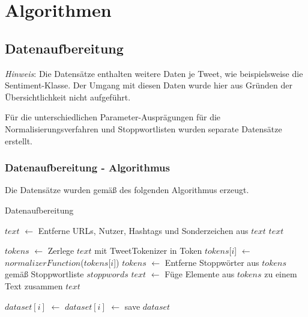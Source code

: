 \section{Algorithmen}

\subsection{Datenaufbereitung}\label{subsec:appendix-data-preparation}

\textit{Hinweis}: Die Datensätze enthalten weitere Daten je Tweet, wie beispielsweise die Sentiment-Klasse.
Der Umgang mit diesen Daten wurde hier aus Gründen der Übersichtlichkeit nicht aufgeführt.

Für die unterschiedlichen Parameter-Ausprägungen für die Normalisierungsverfahren und Stoppwortlisten wurden separate Datensätze erstellt.

\subsubsection{Datenaufbereitung - Algorithmus}
Die Datensätze wurden gemäß des folgenden Algorithmus erzeugt.
\begin{algorithm}
    \caption{Datenaufbereitung}
    \begin{algorithmic}[1]
                \State $text$ $\gets$ Entferne URLs, Nutzer, Hashtags und Sonderzeichen aus $text$
                \State \Return $text$
            \EndFunction

                \State $tokens$ $\gets$ Zerlege $text$ mit TweetTokenizer in Token
                    \State $tokens$[$i$] $\gets$ $normalizerFunction$($tokens$[$i$])
                \EndFor
                \State $tokens$ $\gets$ Entferne Stoppwörter aus $tokens$ gemäß Stoppwortliste $stoppwords$
                \State $text$ $\gets$ Füge Elemente aus $tokens$ zu einem Text zusammen
                \State \Return $text$
            \EndFunction

                \State $dataset[i]$ $\gets$ 
                \State $dataset[i]$ $\gets$ 
            \EndFor
            \State save $dataset$
        \EndProcedure
    \end{algorithmic}
    \label{alg:data-preparation}
\end{algorithm}

